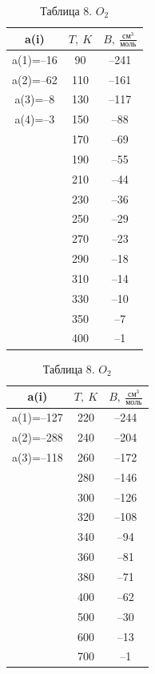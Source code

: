 \documentclass[a4paper]{article}
\numberwithin{equation}{subsection} %
\begin{document}
\begin{table}[ht!]
\centering
\begin{minipage}{0.32\linewidth}
\centering
\begin{tabular}{|c|c|c|}
\hline
a(i) & $T,\ K$ & $B,\ \frac{\text{см}^3}{\text{моль}}$ \\
\hline
a(1)=–16 & 90 & –241 \\
a(2)=–62 & 110 & –161 \\
a(3)=–8 & 130 & –117 \\
a(4)=–3 & 150 & –88 \\
         & 170 & –69 \\
         & 190 & –55 \\
         & 210 & –44 \\
         & 230 & –36 \\
         & 250 & –29 \\
         & 270 & –23 \\
         & 290 & –18 \\
         & 310 & –14 \\
         & 330 & –10 \\
         & 350 & –7 \\
         & 400 & –1 \\
\hline
\end{tabular}
\caption{Таблица 8. $O_2$}
\label{tab:o2}
\end{minipage}
\hfill
\begin{minipage}{0.32\linewidth}
\centering
\begin{tabular}{|c|c|c|}
\hline
a(i) & $T,\ K$ & $B,\ \frac{\text{см}^3}{\text{моль}}$ \\
\hline
a(1)=–127 & 220 & –244 \\
a(2)=–288 & 240 & –204 \\
a(3)=–118 & 260 & –172 \\
          & 280 & –146 \\
          & 300 & –126 \\
          & 320 & –108 \\
          & 340 & –94 \\
          & 360 & –81 \\
          & 380 & –71 \\
          & 400 & –62 \\
          & 500 & –30 \\
          & 600 & –13 \\
          & 700 & –1 \\

\end{tabular}
\end{minipage}
\end{table}
\end{document}

